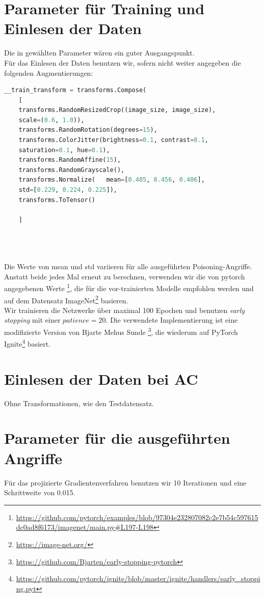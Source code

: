 \documentclass[11pt,a4paper]{article}
\numberwithin{equation}{section}
\begin{document}
	\section{Parameter für Training und Einlesen der Daten}\label{param_net}
	Die in \cite{CH} gewählten Parameter wären ein guter Ausgangspunkt.\\
	Für das Einlesen der Daten benutzen wir, sofern nicht weiter angegeben die folgenden Augmentierungen:
	
	\begin{lstlisting}[language=Python, caption=Augemntierung beim Einlesen der Daten]
	__train_transform = transforms.Compose(
	[
	transforms.RandomResizedCrop((image_size, image_size), 
	scale=(0.6, 1.0)),
	transforms.RandomRotation(degrees=15),
	transforms.ColorJitter(brightness=0.1, contrast=0.1, 
	saturation=0.1, hue=0.1),
	transforms.RandomAffine(15),
	transforms.RandomGrayscale(),
	transforms.Normalize(	mean=[0.485, 0.456, 0.406], 
	std=[0.229, 0.224, 0.225]),
	transforms.ToTensor()
	
	]
	
	
	
	\end{lstlisting}
	Die Werte von mean und std variieren für alle ausgeführten Poisoning-Angriffe. Anstatt beide jedes Mal erneut zu berechnen, verwenden wir die von pytorch angegebenen Werte \footnote{\url{https://github.com/pytorch/examples/blob/97304e232807082c2e7b54c597615dc0ad8f6173/imagenet/main.py\#L197-L198}}, die für die vor-trainierten Modelle empfohlen werden und auf dem Datensatz ImageNet\footnote{\url{https://image-net.org/}} basieren.\\ 
	Wir trainieren die Netzwerke über maximal 100 Epochen und benutzen \textit{early stopping} mit einer $patience=20$. Die verwendete Implementierung ist eine modifizierte Version von Bjarte Mehus Sunde \footnote{\url{https://github.com/Bjarten/early-stopping-pytorch}}, die wiederum auf PyTorch Ignite\footnote{\url{https://github.com/pytorch/ignite/blob/master/ignite/handlers/early\_stopping.pyt}} basiert.\\
	
	\section{Einlesen der Daten bei AC}
	Ohne Transformationen, wie den Testdatensatz.
	
	
	\section{Parameter für die ausgeführten Angriffe}\label{param_attacks}
	Für das projizierte Gradientenverfahren benutzen wir 10 Iterationen und eine Schrittweite von 0.015.
	
\end{document}
